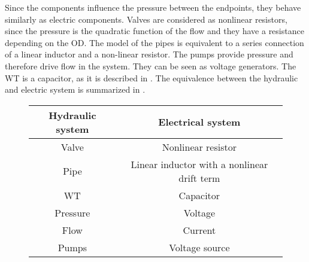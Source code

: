 Since the components influence the pressure between the endpoints, they behave similarly as electric components. Valves are considered as nonlinear resistors, since the pressure is the quadratic function of the flow and they have a resistance depending on the OD.
The model of the pipes is equivalent to a series connection of a linear inductor and a non-linear resistor. %
The pumps provide pressure and therefore drive flow in the system. They can be seen as voltage generators. The WT is a capacitor, as it is described in . The equivalence between the hydraulic and electric system is summarized in .

\begin{figure}[H]
	\centering
\begin{tabular}{c|c} 
  			\bfseries Hydraulic system    &     \bfseries Electrical system  \\ \hline
			Valve		  	  &     Nonlinear resistor   \\ 
			Pipe              &     Linear inductor with a nonlinear drift term       \\ 
			WT 		          &     Capacitor       \\
			Pressure	 	  &     Voltage    \\
			Flow 		      &     Current       \\  
			Pumps 		      &     Voltage source           
\end{tabular}
		\label{tab:hydraulic_electrical}

\end{figure}	


	